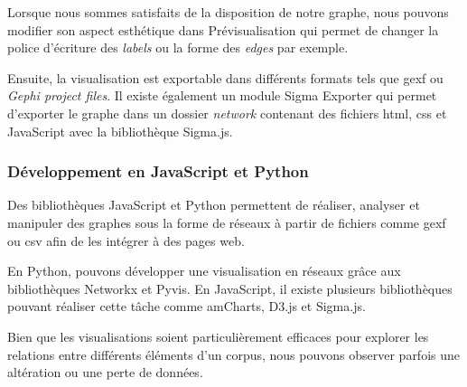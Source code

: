 Lorsque nous sommes satisfaits de la disposition de notre graphe, nous pouvons modifier son aspect esthétique dans \og Prévisualisation \fg qui permet de changer la police d'écriture des \textit{labels} ou la forme des \textit{edges} par exemple. 

Ensuite, la visualisation est exportable dans différents formats tels que \gls{gexf} ou \textit{Gephi project files}. Il existe également un module Sigma Exporter qui permet d'exporter le graphe dans un dossier \textit{network} contenant des fichiers \gls{html}, \gls{css} et JavaScript avec la bibliothèque Sigma.js.

\subsubsection{Développement en JavaScript et Python}

Des bibliothèques JavaScript et Python permettent de réaliser, analyser et manipuler des graphes sous la forme de réseaux à partir de fichiers comme \gls{gexf} ou \gls{csv} afin de les intégrer à des pages web. 

En Python, pouvons développer une visualisation en réseaux grâce aux bibliothèques Networkx et Pyvis. En JavaScript, il existe plusieurs bibliothèques pouvant réaliser cette tâche comme amCharts, D3.js et Sigma.js. 

Bien que les visualisations soient particulièrement efficaces pour explorer les relations entre différents éléments d'un corpus, nous pouvons observer parfois une altération ou une perte de données.


